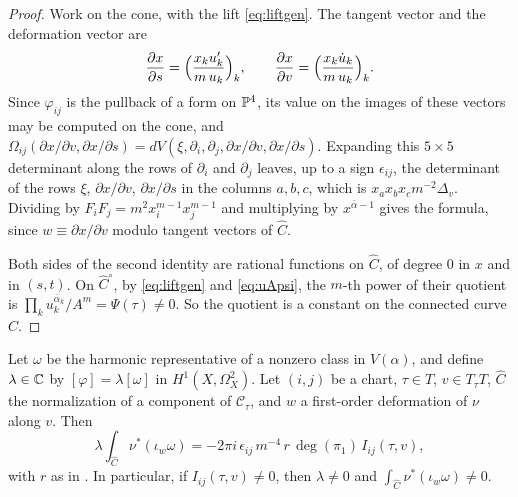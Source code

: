 \begin{proof}
Work on the cone, with the lift \eqref{eq:liftgen}. The tangent vector and
the deformation vector are
\[
  \frac{\partial x}{\partial s}=\Bigl(\frac{x_{k}u'_{k}}{m\,u_{k}}\Bigr)_{k},
  \qquad\frac{\partial x}{\partial v}=\Bigl(\frac{x_{k}\dot u_{k}}{m\,u_{k}}
  \Bigr)_{k}.
\]
Since $\varphi_{ij}$ is the pullback of a form on $\mathbb{P}^{4}$, its value on the
images of these vectors may be computed on the cone, and
$\Omega_{ij}(\partial x/\partial v,\partial x/\partial s)=dV(\xi,\partial_{i},
\partial_{j},\partial x/\partial v,\partial x/\partial s)$. Expanding this
$5\times5$ determinant along the rows of $\partial_{i}$ and $\partial_{j}$
leaves, up to a sign $\epsilon_{ij}$, the determinant of the rows $\xi$,
$\partial x/\partial v$, $\partial x/\partial s$ in the columns $a,b,c$,
which is $x_{a}x_{b}x_{c}m^{-2}\Delta_{v}$. Dividing by $F_{i}F_{j}=m^{2}
x_{i}^{m-1}x_{j}^{m-1}$ and multiplying by $x^{\bar\alpha-1}$ gives the
formula, since $w\equiv\partial x/\partial v$ modulo tangent vectors of
$\widehat C$.

Both sides of the second identity are rational functions on $\widehat C$,
of degree $0$ in $x$ and in $(s,t)$. On $\widehat C^{\circ}$, by
\eqref{eq:liftgen} and \eqref{eq:uApsi}, the $m$-th power of their quotient
is $\prod_{k}u_{k}^{\bar\alpha_{k}}/A^{m}=\Psi(\tau)\ne0$. So the quotient is
a constant on the connected curve $\widehat C$.
\end{proof}

\begin{proposition}\label{prop:residuegen}
Let $\omega$ be the harmonic representative of a nonzero class in
$V(\alpha)$, and define $\lambda\in\mathbb{C}$ by $[\varphi]=\lambda[\omega]$ in
$H^{1}(X,\Omega^{2}_{X})$. Let $(i,j)$ be a chart, $\tau\in T$, $v\in
T_{\tau}T$, $\widehat C$ the normalization of a component of
$\mathcal C_{\tau}$, and $w$ a first-order deformation of $\nu$ along $v$.
Then
\[
  \lambda\int_{\widehat C}\nu^{*}(\iota_{w}\omega)=-2\pi i\,\epsilon_{ij}\,
  m^{-4}\,r\,\deg(\pi_{1})\,I_{ij}(\tau,v),
\]
with $r$ as in . In particular, if $I_{ij}(\tau,v)
\ne0$, then $\lambda\ne0$ and $\int_{\widehat C}\nu^{*}(\iota_{w}\omega)\ne0$.
\end{proposition}

